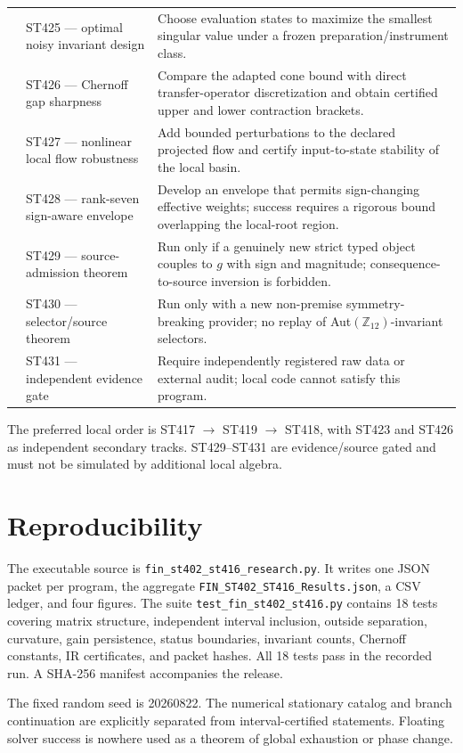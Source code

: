 \documentclass[11pt,a4paper]{article}
\begin{document}
\begin{longtable}{>{\raggedright\arraybackslash}p{}>{\raggedright\arraybackslash}p{}>{\raggedright\arraybackslash}p{}}
3&ST425 --- optimal noisy invariant design&Choose evaluation states to maximize the smallest singular value under a frozen preparation/instrument class.\\
3&ST426 --- Chernoff gap sharpness&Compare the adapted cone bound with direct transfer-operator discretization and obtain certified upper and lower contraction brackets.\\
3&ST427 --- nonlinear local flow robustness&Add bounded perturbations to the declared projected flow and certify input-to-state stability of the local basin.\\
4&ST428 --- rank-seven sign-aware envelope&Develop an envelope that permits sign-changing effective weights; success requires a rigorous bound overlapping the local-root region.\\
4&ST429 --- source-admission theorem&Run only if a genuinely new strict typed object couples to $g$ with sign and magnitude; consequence-to-source inversion is forbidden.\\
5&ST430 --- selector/source theorem&Run only with a new non-premise symmetry-breaking provider; no replay of Aut$(\mathbb Z_{12})$-invariant selectors.\\
5&ST431 --- independent evidence gate&Require independently registered raw data or external audit; local code cannot satisfy this program.\\
\bottomrule
\end{longtable}

The preferred local order is ST417 $\to$ ST419 $\to$ ST418, with ST423 and
ST426 as independent secondary tracks.  ST429--ST431 are evidence/source gated and
must not be simulated by additional local algebra.

\section{Reproducibility}

The executable source is
\texttt{fin\_st402\_st416\_research.py}.  It writes one JSON packet per program,
the aggregate \texttt{FIN\_ST402\_ST416\_Results.json}, a CSV ledger, and four
figures.  The suite \texttt{test\_fin\_st402\_st416.py} contains 18 tests covering
matrix structure, independent interval inclusion, outside separation, curvature,
gain persistence, status boundaries, invariant counts, Chernoff constants, IR
certificates, and packet hashes.  All 18 tests pass in the recorded run.  A SHA-256
manifest accompanies the release.

The fixed random seed is 20260822.  The numerical stationary catalog and branch
continuation are explicitly separated from interval-certified statements.  Floating
solver success is nowhere used as a theorem of global exhaustion or phase change.
\end{document}
